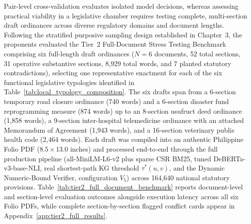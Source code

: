 Pair-level cross-validation evaluates isolated model decisions, whereas assessing practical viability in a legislative chamber requires testing complete, multi-section draft ordinances across diverse regulatory domains and document lengths. Following the stratified purposive sampling design established in Chapter~3, the proponents evaluated the Tier~2 Full-Document Stress Testing Benchmark comprising six full-length draft ordinances ($N = 6$ documents, 52 total sections, 31 operative substantive sections, 8,929 total words, and 7 planted statutory contradictions), selecting one representative enactment for each of the six functional legislative typologies identified in Table~\ref{tab:local_typology_composition}. The six drafts span from a 6-section temporary road closure ordinance (740 words) and a 6-section disaster fund reprogramming measure (874 words) up to an 8-section usufruct deed ordinance (1,858 words), a 9-section inter-hospital telemedicine ordinance with an attached Memorandum of Agreement (1,943 words), and a 16-section veterinary public health code (2,464 words). Each draft was compiled into an authentic Philippine Folio PDF ($8.5 \times 13.0$ inches) and processed end-to-end through the full production pipeline (all-MiniLM-L6-v2 plus sparse CSR BM25, tuned DeBERTa-v3-base-NLI, real shortest-path KG threshold $\tau^*(u, v)$, and the Dynamic Numeric-Bound Verifier, configuration $V_5$) across 164,640 national statutory provisions. Table~\ref{tab:tier2_full_document_benchmark} reports document-level and section-level evaluation outcomes alongside execution latency across all six Folio PDFs, while complete section-by-section flagged conflict cards appear in Appendix~\ref{app:tier2_full_results}.

